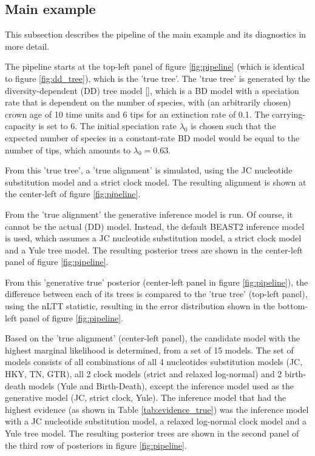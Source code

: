 \newpage

\subsection{Main example}
\label{subsec:main_example}

This subsection describes the pipeline of the main example 
and its diagnostics in more detail. 

The pipeline starts at the top-left panel of figure \ref{fig:pipeline} (which 
is identical to figure \ref{fig:dd_tree}),
which is the 'true tree'.
The 'true tree' is generated by the diversity-dependent (DD) 
tree model [\citep{DDD, etienne2012diversity}],
which is a BD model with a speciation rate that is dependent on the number of species,
with (an arbitrarily chosen) crown age of 10 time units 
and 6 tips for an extinction rate of 0.1. 
The carrying-capacity is set to 6. 
The initial speciation rate $\lambda_0$ is chosen 
such that the expected number of species in a constant-rate BD model 
would be equal to the number of tips, which amounts to $\lambda_0 = 0.63$.

From this 'true tree', a 'true alignment' is simulated, using
the JC nucleotide substitution model and a strict clock model.
The resulting alignment is shown at the center-left
of figure \ref{fig:pipeline}.

From the 'true alignment' the generative inference model is run.
Of course, it cannot be the actual (DD) model. Instead, the
default BEAST2 inference model is used, which assumes a JC nucleotide
substitution model, a strict clock model and a Yule tree model.
The resulting posterior trees are shown in the
center-left panel of figure \ref{fig:pipeline}.

From this 'generative true' posterior (center-left panel in figure \ref{fig:pipeline}), the difference between each of its trees is
compared to the 'true tree' (top-left panel), using the nLTT statistic,
resulting in the error distribution shown in the bottom-left panel
of figure \ref{fig:pipeline}.

Based on the 'true alignment' (center-left panel), the candidate model
with the highest marginal likelihood is determined, from a set of 
15 models. The set of models consists of all combinations
of all 4 nucleotides substitution models (JC, HKY, TN, GTR),
all 2 clock models (strict and relaxed log-normal) and 2 birth-death
models (Yule and Birth-Death), except the inference model used as the
generative model (JC, strict clock, Yule). The inference model that had the
highest evidence (as shown in Table \ref{tab:evidence_true}) was 
the inference model with a JC nucleotide substitution model,
a relaxed log-normal clock model and a Yule tree model.
The resulting posterior trees are shown in the second panel
of the third row of posteriors in figure \ref{fig:pipeline}.

